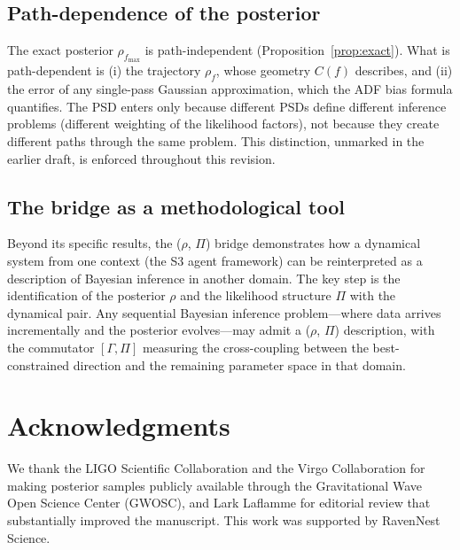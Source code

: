 \documentclass[twocolumn,prd,showpacs,superscriptaddress]{revtex4-2}
\newcommand{\fmax}{f_{\text{max}}}
\begin{document}
\subsection{Path-dependence of the posterior}

The exact posterior $\rho_{\fmax}$ is path-independent
(Proposition~\ref{prop:exact}).  What is path-dependent is (i) the
trajectory $\rho_f$, whose geometry $C(f)$ describes, and (ii) the
error of any single-pass Gaussian approximation, which the ADF bias
formula quantifies.  The PSD enters only because different PSDs define
different inference problems (different weighting of the likelihood
factors), not because they create different paths through the same
problem.  This distinction, unmarked in the earlier draft, is enforced
throughout this revision.

\subsection{The bridge as a methodological tool}

Beyond its specific results, the ($\rho$, $\Pi$) bridge demonstrates
how a dynamical system from one context (the S3 agent framework) can be
reinterpreted as a description of Bayesian inference in another domain.
The key step is the identification of the posterior $\rho$ and the
likelihood structure $\Pi$ with the dynamical pair.  Any sequential
Bayesian inference problem---where data arrives incrementally and the
posterior evolves---may admit a ($\rho$, $\Pi$) description, with the
commutator $[\Gamma, \Pi]$ measuring the cross-coupling between the
best-constrained direction and the remaining parameter space in that
domain.

\section*{Acknowledgments}

We thank the LIGO Scientific Collaboration and the Virgo Collaboration
for making posterior samples publicly available through the
Gravitational Wave Open Science Center (GWOSC), and Lark Laflamme for
editorial review that substantially improved the manuscript.  This work
was supported by RavenNest Science.
\end{document}
